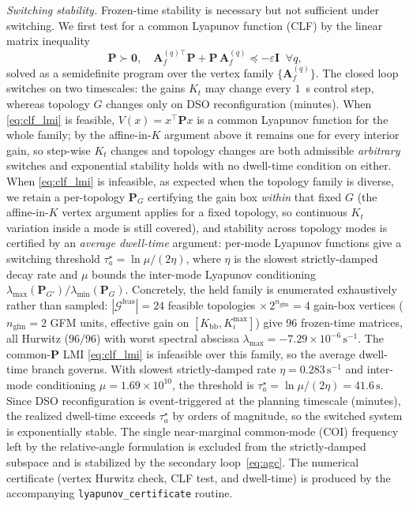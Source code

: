 \documentclass[lettersize,journal]{IEEEtran}
\begin{document}
\emph{Switching stability.} Frozen-time stability is necessary but not sufficient under switching. We first test for a common Lyapunov function (CLF) by the linear matrix inequality
\begin{equation}
\mathbf{P}\succ\mathbf 0,\quad
\mathbf{A}_f^{(q)\top}\mathbf{P}+\mathbf{P}\,\mathbf{A}_f^{(q)}
\preceq-\varepsilon\mathbf{I}\;\;\forall q,
\label{eq:clf_lmi}
\end{equation}
solved as a semidefinite program over the vertex family $\{\mathbf{A}_f^{(q)}\}$. The closed loop switches on two timescales: the gains $K_t$ may change every $1$~s control step, whereas topology $G$ changes only on DSO reconfiguration (minutes). When \eqref{eq:clf_lmi} is feasible, $V(x)=x^{\!\top}\mathbf{P}x$ is a common Lyapunov function for the whole family; by the affine-in-$K$ argument above it remains one for every interior gain, so step-wise $K_t$ changes and topology changes are both admissible \emph{arbitrary} switches and exponential stability holds with no dwell-time condition on either. When \eqref{eq:clf_lmi} is infeasible, as expected when the topology family is diverse, we retain a per-topology $\mathbf{P}_G$ certifying the gain box \emph{within} that fixed $G$ (the affine-in-$K$ vertex argument applies for a fixed topology, so continuous $K_t$ variation inside a mode is still covered), and stability across topology modes is certified by an \emph{average dwell-time} argument: per-mode Lyapunov functions give a switching threshold $\tau_a^{\star}=\ln\mu/(2\eta)$, where $\eta$ is the slowest strictly-damped decay rate and $\mu$ bounds the inter-mode Lyapunov conditioning $\lambda_{\max}(\mathbf{P}_{G'})/\lambda_{\min}(\mathbf{P}_G)$. Concretely, the held family is enumerated exhaustively rather than sampled: $|\mathcal{G}^{\mathrm{feas}}|=24$ feasible topologies $\times\,2^{n_{\mathrm{gfm}}}=4$ gain-box vertices ($n_{\mathrm{gfm}}=2$ GFM units, effective gain on $[K_{\mathrm{bb}},K_i^{\max}]$) give $96$ frozen-time matrices, all Hurwitz ($96/96$) with worst spectral abscissa $\lambda_{\max}=-7.29\times10^{-6}\,\mathrm{s^{-1}}$. The common-$\mathbf{P}$ LMI \eqref{eq:clf_lmi} is infeasible over this family, so the average dwell-time branch governs. With slowest strictly-damped rate $\eta=0.283\,\mathrm{s^{-1}}$ and inter-mode conditioning $\mu=1.69\times10^{10}$, the threshold is $\tau_a^{\star}=\ln\mu/(2\eta)=41.6\,\mathrm{s}$. Since DSO reconfiguration is event-triggered at the planning timescale (minutes), the realized dwell-time exceeds $\tau_a^{\star}$ by orders of magnitude, so the switched system is exponentially stable. The single near-marginal common-mode (COI) frequency left by the relative-angle formulation is excluded from the strictly-damped subspace and is stabilized by the secondary loop~\eqref{eq:agc}. The numerical certificate (vertex Hurwitz check, CLF test, and dwell-time) is produced by the accompanying \texttt{lyapunov\_certificate} routine.
\end{document}
